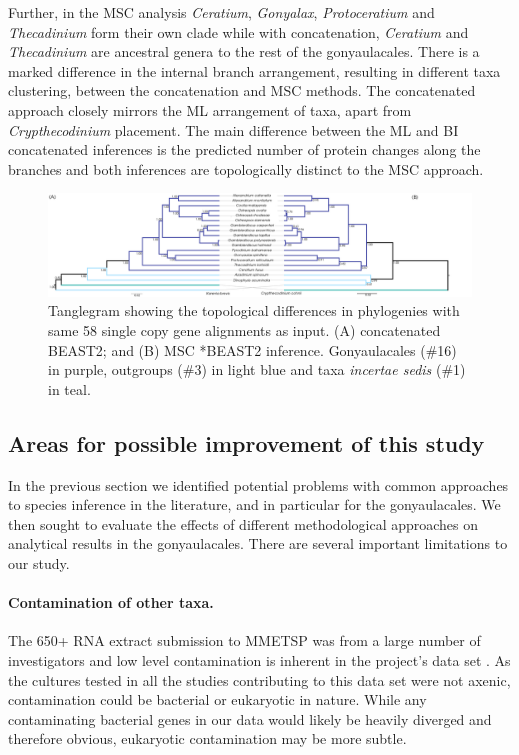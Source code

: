 \documentclass[fleqn,10pt,lineno]{wlpeerj} %
\begin{document}
Further, in the MSC analysis \textit{Ceratium}, \textit{Gonyalax}, \textit{Protoceratium} and \textit{Thecadinium} form their own clade while with concatenation, \textit{Ceratium} and \textit{Thecadinium} are ancestral genera to the rest of the gonyaulacales. 
There is a marked difference in the internal branch arrangement, resulting in different taxa clustering, between the concatenation and MSC methods.
The concatenated approach closely mirrors the ML arrangement of taxa, apart from \textit{Crypthecodinium} placement. 
The main difference between the ML and BI concatenated inferences is the predicted number of protein changes along the branches and both inferences are topologically distinct to the MSC approach.

\begin{figure}[ht]
\centering
\includegraphics[width=\linewidth]{gonya-figs/SC-MSC-BI-vs-SC-concat-BI.png} 
\caption{Tanglegram showing the topological differences in phylogenies with same 58 single copy gene alignments as input. (A) concatenated BEAST2; and (B) MSC *BEAST2 inference. Gonyaulacales (\#16) in purple, outgroups (\#3) in light blue and taxa \textit{incertae sedis} (\#1) in teal.} 
\label{fig:tangleconcatBI}
\end{figure} 



\subsection*{Areas for possible improvement of this study}
In the previous section we identified potential problems with common approaches to species inference in the literature, and in particular for the gonyaulacales. 
We then sought to evaluate the effects of different methodological approaches on analytical results in the gonyaulacales. 
There are several important limitations to our study. 
\paragraph*{Contamination of other taxa.} 
The 650+ RNA extract submission to MMETSP was from a large number of investigators and low level contamination is inherent in the project's data set \citep{keeling2014marine}. 
As the cultures tested in all the studies contributing to this data set were not axenic, contamination could be bacterial or eukaryotic in nature. 
While any contaminating bacterial genes in our data would likely be heavily diverged and therefore obvious, eukaryotic contamination may be more subtle.
\end{document}
